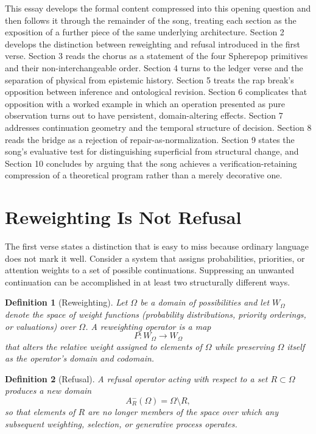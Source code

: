 \documentclass[11pt]{article}
\newtheorem{definition}{Definition}[section]
\begin{document}
This essay develops the formal content compressed into this opening question and then follows it through the remainder of the song, treating each section as the exposition of a further piece of the same underlying architecture. Section 2 develops the distinction between reweighting and refusal introduced in the first verse. Section 3 reads the chorus as a statement of the four Spherepop primitives and their non-interchangeable order. Section 4 turns to the ledger verse and the separation of physical from epistemic history. Section 5 treats the rap break's opposition between inference and ontological revision. Section 6 complicates that opposition with a worked example in which an operation presented as pure observation turns out to have persistent, domain-altering effects. Section 7 addresses continuation geometry and the temporal structure of decision. Section 8 reads the bridge as a rejection of repair-as-normalization. Section 9 states the song's evaluative test for distinguishing superficial from structural change, and Section 10 concludes by arguing that the song achieves a verification-retaining compression of a theoretical program rather than a merely decorative one.

\section{Reweighting Is Not Refusal}

The first verse states a distinction that is easy to miss because ordinary language does not mark it well. Consider a system that assigns probabilities, priorities, or attention weights to a set of possible continuations. Suppressing an unwanted continuation can be accomplished in at least two structurally different ways.

\begin{definition}[Reweighting]
Let $\Omega$ be a domain of possibilities and let $W_\Omega$ denote the space of weight functions (probability distributions, priority orderings, or valuations) over $\Omega$. A reweighting operator is a map
\[
P : W_\Omega \rightarrow W_\Omega
\]
that alters the relative weight assigned to elements of $\Omega$ while preserving $\Omega$ itself as the operator's domain and codomain.
\end{definition}

\begin{definition}[Refusal]
A refusal operator acting with respect to a set $R \subset \Omega$ produces a new domain
\[
A^{-}_{R}(\Omega) = \Omega \setminus R,
\]
so that elements of $R$ are no longer members of the space over which any subsequent weighting, selection, or generative process operates.
\end{definition}
\end{document}
